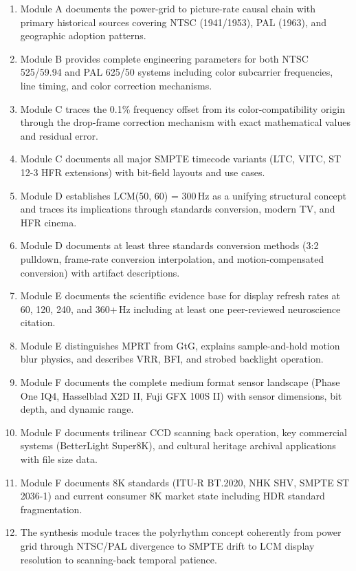 \documentclass[11pt,letterpaper]{article}
\begin{document}
\begin{enumerate}[leftmargin=*, label=\textbf{SC-\arabic*.}]
  \item Module A documents the power-grid to picture-rate causal chain with primary historical sources
        covering NTSC (1941/1953), PAL (1963), and geographic adoption patterns.
  \item Module B provides complete engineering parameters for both NTSC 525/59.94 and PAL 625/50
        systems including color subcarrier frequencies, line timing, and color correction mechanisms.
  \item Module C traces the 0.1\% frequency offset from its color-compatibility origin through the
        drop-frame correction mechanism with exact mathematical values and residual error.
  \item Module C documents all major SMPTE timecode variants (LTC, VITC, ST 12-3 HFR extensions)
        with bit-field layouts and use cases.
  \item Module D establishes LCM(50, 60) = 300\,Hz as a unifying structural concept and traces its
        implications through standards conversion, modern TV, and HFR cinema.
  \item Module D documents at least three standards conversion methods (3:2 pulldown, frame-rate
        conversion interpolation, and motion-compensated conversion) with artifact descriptions.
  \item Module E documents the scientific evidence base for display refresh rates at 60, 120, 240,
        and 360+\,Hz including at least one peer-reviewed neuroscience citation.
  \item Module E distinguishes MPRT from GtG, explains sample-and-hold motion blur physics, and
        describes VRR, BFI, and strobed backlight operation.
  \item Module F documents the complete medium format sensor landscape (Phase One IQ4, Hasselblad
        X2D II, Fuji GFX 100S II) with sensor dimensions, bit depth, and dynamic range.
  \item Module F documents trilinear CCD scanning back operation, key commercial systems (BetterLight
        Super8K), and cultural heritage archival applications with file size data.
  \item Module F documents 8K standards (ITU-R BT.2020, NHK SHV, SMPTE ST 2036-1) and current
        consumer 8K market state including HDR standard fragmentation.
  \item The synthesis module traces the polyrhythm concept coherently from power grid through
        NTSC/PAL divergence to SMPTE drift to LCM display resolution to scanning-back temporal patience.
\end{enumerate}
\end{document}
